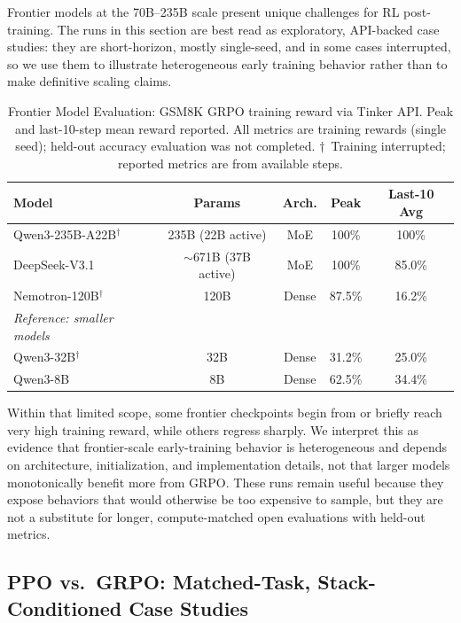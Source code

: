 \documentclass{article}
\begin{document}
Frontier models at the 70B--235B scale present unique challenges for RL
post-training. The runs in this section are best read as exploratory,
API-backed case studies: they are short-horizon, mostly single-seed, and in
some cases interrupted, so we use them to illustrate heterogeneous early
training behavior rather than to make definitive scaling claims.

\begin{table}[htbp]
\centering
\caption{Frontier Model Evaluation: GSM8K GRPO training reward via Tinker API.
Peak and last-10-step mean reward reported. All metrics are training rewards
(single seed); held-out accuracy evaluation was not completed.
$\dagger$~Training interrupted; reported metrics are from available steps.}
\label{tab:frontier}
\begin{tabular}{lcccc}
\toprule
\textbf{Model} & \textbf{Params} & \textbf{Arch.} & \textbf{Peak} & \textbf{Last-10 Avg} \\
\midrule
Qwen3-235B-A22B$^\dagger$ & 235B (22B active) & MoE & 100\% & 100\% \\
DeepSeek-V3.1 & $\sim$671B (37B active) & MoE & 100\% & 85.0\% \\
Nemotron-120B$^\dagger$ & 120B & Dense & 87.5\% & 16.2\% \\
\midrule
\textit{Reference: smaller models} & & & & \\
Qwen3-32B$^\dagger$ & 32B & Dense & 31.2\% & 25.0\% \\
Qwen3-8B & 8B & Dense & 62.5\% & 34.4\% \\
\bottomrule
\end{tabular}
\end{table}

Within that limited scope, some frontier checkpoints begin from or briefly
reach very high training reward, while others regress sharply. We interpret
this as evidence that frontier-scale early-training behavior is heterogeneous
and depends on architecture, initialization, and implementation details, not
that larger models monotonically benefit more from GRPO. These runs remain
useful because they expose behaviors that would otherwise be too expensive to
sample, but they are not a substitute for longer, compute-matched open
evaluations with held-out metrics.

\subsection{PPO vs.~GRPO: Matched-Task, Stack-Conditioned Case Studies}
\label{sec:ppo_grpo}
\end{document}
